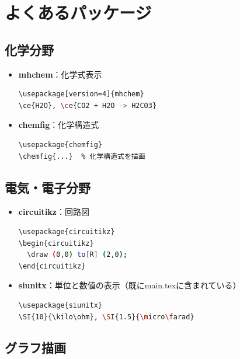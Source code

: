 \documentclass[11pt]{ltjarticle}
\begin{document}
\section{よくあるパッケージ}

\subsection{化学分野}

\begin{itemize}
  \item \textbf{mhchem}：化学式表示
    \begin{lstlisting}[language=bash, basicstyle=\ttfamily\small]
\usepackage[version=4]{mhchem}
\ce{H2O}, \ce{CO2 + H2O -> H2CO3}
    \end{lstlisting}

  \item \textbf{chemfig}：化学構造式
    \begin{lstlisting}[language=bash, basicstyle=\ttfamily\small]
\usepackage{chemfig}
\chemfig{...}  % 化学構造式を描画
    \end{lstlisting}
\end{itemize}

\subsection{電気・電子分野}

\begin{itemize}
  \item \textbf{circuitikz}：回路図
    \begin{lstlisting}[language=bash, basicstyle=\ttfamily\small]
\usepackage{circuitikz}
\begin{circuitikz}
  \draw (0,0) to[R] (2,0);
\end{circuitikz}
    \end{lstlisting}

  \item \textbf{siunitx}：単位と数値の表示（既にmain.texに含まれている）
    \begin{lstlisting}[language=bash, basicstyle=\ttfamily\small]
\usepackage{siunitx}
\SI{10}{\kilo\ohm}, \SI{1.5}{\micro\farad}
    \end{lstlisting}
\end{itemize}

\subsection{グラフ描画}
\end{document}
